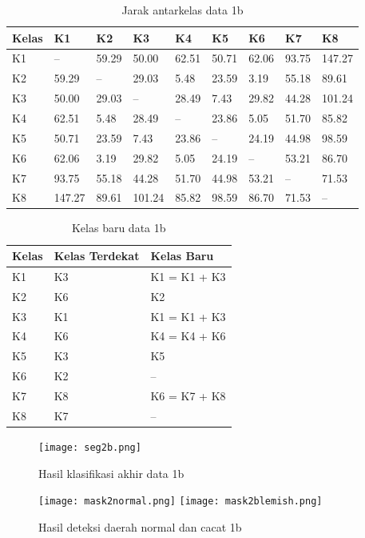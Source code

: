 \documentclass[laporan.tex]{subfiles}
\begin{document}
\begin{table}[h!]
\centering
\begin{tabular}{|l|l|l|l|l|l|l|l|l|}
\hline
Kelas & K1 & K2 & K3 & K4 & K5 & K6 & K7 & K8 \\
\hline
K1 & -- & 59.29 & 50.00 & 62.51 & 50.71 & 62.06 & 93.75 & 147.27 \\
K2 & 59.29 & -- & 29.03 & 5.48 & 23.59 & 3.19 & 55.18 & 89.61 \\
K3 & 50.00 & 29.03 & -- & 28.49 & 7.43 & 29.82 & 44.28 & 101.24 \\
K4 & 62.51 & 5.48 & 28.49 & -- & 23.86 & 5.05 & 51.70 & 85.82 \\
K5 & 50.71 & 23.59 & 7.43 & 23.86 & -- & 24.19 & 44.98 & 98.59 \\
K6 & 62.06 & 3.19 & 29.82 & 5.05 & 24.19 & -- & 53.21 & 86.70 \\
K7 & 93.75 & 55.18 & 44.28 & 51.70 & 44.98 & 53.21 & -- & 71.53 \\
K8 & 147.27 & 89.61 & 101.24 & 85.82 & 98.59 & 86.70 & 71.53 & -- \\
\hline
\end{tabular}
\caption[]{Jarak antarkelas data 1b}
\label{table:distlow}
\end{table}

\begin{table}[h!]
\centering
\begin{tabular}{|l|l|l|}
\hline
Kelas & Kelas Terdekat & Kelas Baru \\
\hline
K1 & K3 & K1 = K1 + K3 \\
K2 & K6 & K2 \\
K3 & K1 & K1 = K1 + K3 \\
K4 & K6 & K4 = K4 + K6 \\
K5 & K3 & K5 \\
K6 & K2 & -- \\
K7 & K8 & K6 = K7 + K8 \\
K8 & K7 & -- \\
\hline
\end{tabular}
\caption[]{Kelas baru data 1b}
\end{table}


\begin{figure}[h!]
\centering
\texttt{[image: seg2b.png]}
\caption[]{Hasil klasifikasi akhir data 1b}
\end{figure}

\begin{figure}[h!]
\centering
\texttt{[image: mask2normal.png]} \qquad
\texttt{[image: mask2blemish.png]}
\caption[]{Hasil deteksi daerah normal dan cacat 1b}
\end{figure}
\end{document}
